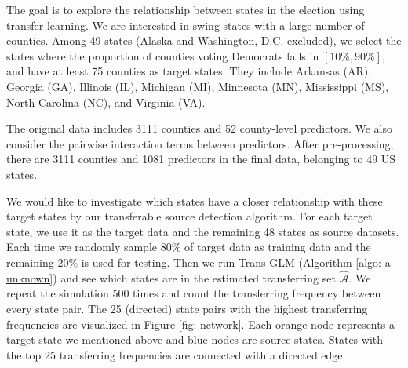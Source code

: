 \documentclass[12pt]{article}
\newcommand{\<}{\langle}
\renewcommand{\>}{\rangle}
\begin{document}
The goal is to explore the relationship between states in the election using transfer learning. We are interested in swing states with a large number of counties. Among 49 states (Alaska and Washington, D.C. excluded), we select the states where the proportion of counties voting Democrats falls in $[10\%, 90\%]$, and have at least 75 counties as target states. They include Arkansas (AR), Georgia (GA), Illinois (IL), Michigan (MI), Minnesota (MN), Mississippi (MS), North Carolina (NC), and Virginia (VA). 

The original data includes 3111 counties and 52 county-level predictors. We also consider the pairwise interaction terms between predictors. After pre-processing, there are 3111 counties and 1081 predictors in the final data, belonging to 49 US states.

We would like to investigate which states have a closer relationship with these target states by our transferable source detection algorithm. For each target state, we use it as the target data and the remaining 48 states as source datasets. Each time we randomly sample 80\% of target data as training data and the remaining 20\%  is used for testing. Then we run Trans-GLM (Algorithm \ref{algo: a unknown}) and see which states are in the estimated transferring set $\widehat{\mathcal{A}}$. We repeat the simulation 500 times and count the transferring frequency between every state pair. The 25 (directed) state pairs with the highest transferring frequencies are visualized in Figure \ref{fig: network}. Each orange node represents a target state we mentioned above and blue nodes are source states. States with the top 25 transferring frequencies are connected with a directed edge. 
\end{document}
